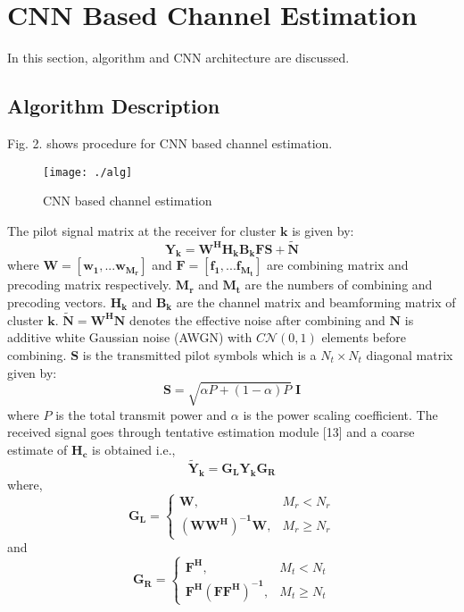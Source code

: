 \documentclass[journal]{IEEEtran}
\begin{document}
\section{CNN Based Channel Estimation}
In this section, algorithm and CNN architecture are discussed. 
\subsection{Algorithm Description}
Fig. 2. shows procedure for CNN based channel estimation.
\begin{figure}[h]
	\centering
	\texttt{[image: ./alg]} 
	\caption{CNN based channel estimation}
\end{figure}
The pilot signal matrix at the receiver for cluster $\mathbf{k}$ is given by:
\begin{equation}
\mathbf{Y_k}= \mathbf{W^H H_kB_kFS + \tilde N}
\end{equation}
where $\mathbf {W =[w_1,...w_{M_r}]}$ and $\mathbf {F =[f_1,...f_{M_t}]}$ are combining matrix and precoding matrix respectively. $\mathbf {M_r}$ and $\mathbf {M_t}$ are the numbers of combining and precoding vectors. $\mathbf {H_k}$ and $\mathbf {B_k}$ are the channel matrix and beamforming matrix of cluster $\mathbf{k}$. $\mathbf{\tilde N = W^H N}$ denotes the effective noise after combining and $\mathbf{N}$ is additive white Gaussian noise (AWGN) with
$C\mathcal{N}(0,1)$ elements before combining. $\mathbf{S}$ is the transmitted pilot symbols which is a $N_t \times N_t$ diagonal matrix given by:
\begin{equation}
\mathbf{S} = \sqrt{\alpha P + (1-\alpha)P} \; \mathbf{I}
\end{equation}
where $P$ is the total transmit power and $\alpha$ is the power scaling coefficient. The received signal goes through tentative estimation module [13] and a coarse estimate of $\mathbf {H_c}$ is obtained i.e.,
\begin{equation}
\mathbf{\tilde{Y}_k = G_L Y_k G_R}
\end{equation}
where, 
\begin{equation}
\mathbf{G_L} =
\begin{cases}
\mathbf{W}, & M_r < N_r\\
\mathbf{(WW^H)^{-1} W}, & M_r \geq N_r
\end{cases} 
\end{equation}
and
\begin{equation}
\mathbf{G_R} =
\begin{cases}
\mathbf{F^H}, & M_t < N_t\\
\mathbf{F^H(FF^H)^{-1}}, & M_t \geq N_t
\end{cases} 
\end{equation}
\end{document}
